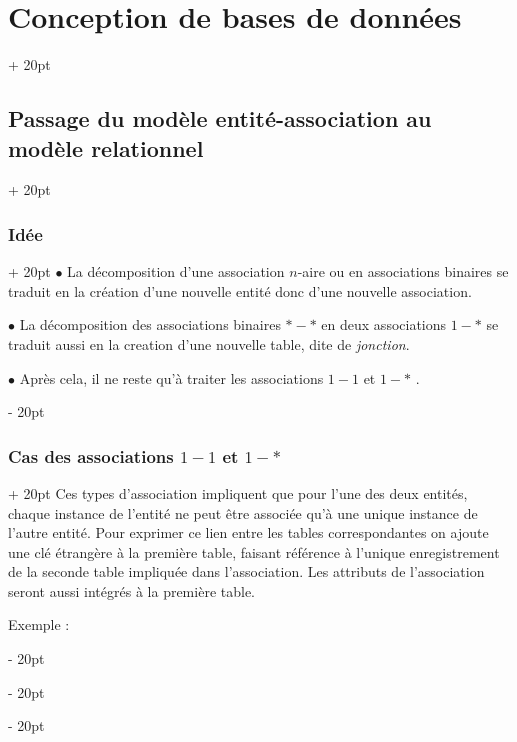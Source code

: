 \documentclass[a4paper, 12pt, twoside]{article}
\newcommand{\ind}[1][20pt]{\advance\leftskip + #1}
\newcommand{\deind}[1][20pt]{\advance\leftskip - #1}
\newenvironment{indt}[2][20pt]{#2 \par \ind[#1]}{\par \deind} %
\begin{document}
\begin{indt}{\section{Conception de bases de données}}
\begin{indt}{\subsection{Passage du modèle entité-association au modèle relationnel}}
\begin{indt}{\subsubsection{Idée}}
                $\bullet$ La décomposition d'une association $n$-aire ou en associations binaires se traduit en la création d'une nouvelle entité donc d'une nouvelle association.

                $\bullet$ La décomposition des associations binaires $*-*$ en deux associations $1-*$ se traduit aussi en la creation d'une nouvelle table, dite de \textit{jonction}.

                $\bullet$ Après cela, il ne reste qu'à traiter les associations $1-1$  et $1-*$ .
            \end{indt}

            \vspace{12pt}
            
            \begin{indt}{\subsubsection{Cas des associations $1-1$ et $1-*$}}
                Ces types d'association impliquent que pour l'une des deux entités, chaque instance de l'entité ne peut être associée qu'à une unique instance de l'autre entité. Pour exprimer ce lien entre les tables correspondantes on ajoute une clé étrangère à la première table, faisant référence à l'unique enregistrement de la seconde table impliquée dans l'association. Les attributs de l'association seront aussi intégrés à la première table.


                Exemple :


\end{indt}
\end{indt}
\end{indt}
\end{document}
